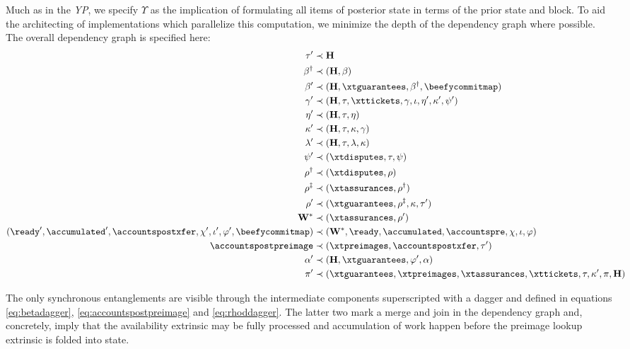 Much as in the \emph{YP}, we specify $\Upsilon$ as the implication of formulating all items of posterior state in terms of the prior state and block. To aid the architecting of implementations which parallelize this computation, we minimize the depth of the dependency graph where possible. The overall dependency graph is specified here:
\begin{align}\label{eq:transitionfunctioncomposition}
  \tau' &\prec \mathbf{H} \\
  \beta^\dagger &\prec (\mathbf{H}, \beta) \label{eq:betadagger} \\
  \beta' &\prec (\mathbf{H}, \xtguarantees, \beta^\dagger, \beefycommitmap) \\
  \gamma' &\prec (\mathbf{H}, \tau, \xttickets, \gamma, \iota, \eta', \kappa', \psi') \\
  \eta' &\prec (\mathbf{H}, \tau, \eta) \\
  \kappa' &\prec (\mathbf{H}, \tau, \kappa, \gamma) \\
  \lambda' &\prec (\mathbf{H}, \tau, \lambda, \kappa) \\
  \psi' &\prec (\xtdisputes, \tau, \psi) \\
  \rho^\dagger &\prec (\xtdisputes, \rho) \label{eq:rhodagger} \\
  \rho^\ddagger &\prec (\xtassurances, \rho^\dagger) \label{eq:rhoddagger} \\
  \rho' &\prec (\xtguarantees, \rho^\ddagger, \kappa, \tau') \\
  \mathbf{W}^* &\prec (\xtassurances, \rho') \\
  (\ready', \accumulated', \accountspostxfer, \chi', \iota', \varphi', \beefycommitmap) &\prec (\mathbf{W}^*, \ready, \accumulated, \accountspre, \chi, \iota, \varphi) \\
  \accountspostpreimage &\prec (\xtpreimages, \accountspostxfer, \tau') \label{eq:accountspostpreimage} \\
  \alpha' &\prec (\mathbf{H}, \xtguarantees, \varphi', \alpha) \\
  \pi' &\prec (\xtguarantees, \xtpreimages, \xtassurances, \xttickets, \tau, \kappa', \pi, \mathbf{H})\!\!\!\!\!\!\!\!
\end{align}

The only synchronous entanglements are visible through the intermediate components superscripted with a dagger and defined in equations \ref{eq:betadagger}, \ref{eq:accountspostpreimage} and \ref{eq:rhoddagger}. The latter two mark a merge and join in the dependency graph and, concretely, imply that the availability extrinsic may be fully processed and accumulation of work happen before the preimage lookup extrinsic is folded into state.

